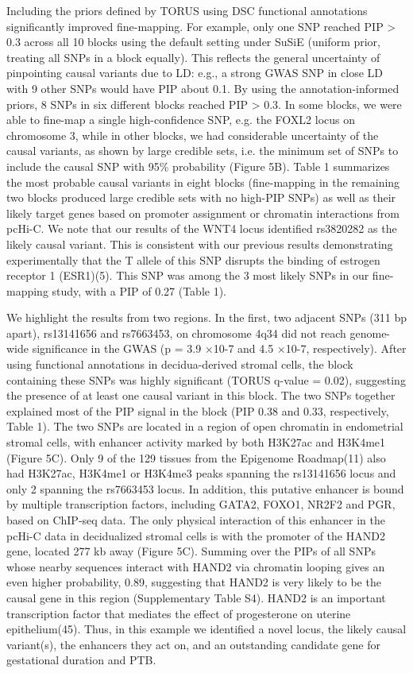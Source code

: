 Including the priors defined by TORUS using DSC  functional annotations significantly improved fine-mapping.  For example, only one SNP reached PIP > 0.3 across all 10 blocks using the
default setting under SuSiE (uniform prior, treating all SNPs in a block equally). This reflects the general uncertainty of pinpointing causal variants due to LD: e.g., a strong GWAS SNP in
close LD with 9 other SNPs would have PIP about 0.1. By using the annotation-informed priors, 8 SNPs in six different blocks reached PIP > 0.3. In some blocks, we were able to fine-map a single
high-confidence SNP, e.g. the FOXL2 locus on chromosome 3, while in other blocks, we had considerable uncertainty of the causal variants, as shown by large credible sets, i.e. the minimum set of
SNPs to include the causal SNP with 95\% probability (Figure 5B). Table 1 summarizes the most probable causal variants in eight blocks (fine-mapping in the remaining two blocks produced large
credible sets with no high-PIP SNPs) as well as their likely target genes based on promoter assignment or chromatin interactions from pcHi-C. We note that our results of the WNT4 locus identified
rs3820282 as the likely causal variant. This is consistent with our previous results demonstrating experimentally that the T allele of this SNP disrupts the binding of estrogen receptor 1 (ESR1)(5).
This SNP was among the 3 most likely SNPs in our fine-mapping study, with a PIP of 0.27 (Table 1). 



We highlight the results from two regions. In the first, two adjacent SNPs (311 bp apart), rs13141656 and rs7663453, on chromosome 4q34 did not reach genome-wide significance in the GWAS (p = 3.9 ×10-7 and 4.5 ×10-7, respectively).
After using functional annotations in decidua-derived stromal cells, the block containing these SNPs was highly significant (TORUS q-value = 0.02), suggesting the presence of at least one causal variant in this block.
The two SNPs together explained most of the PIP signal in the block (PIP 0.38 and 0.33, respectively, Table 1). The two SNPs are located in a region of open chromatin in endometrial stromal cells, with enhancer activity
marked by both H3K27ac and H3K4me1 (Figure 5C). Only 9 of the 129 tissues from the Epigenome Roadmap(11) also had H3K27ac, H3K4me1 or H3K4me3 peaks spanning the rs13141656 locus and only 2 spanning the rs7663453 locus.
In addition, this putative enhancer is bound by multiple transcription factors, including GATA2, FOXO1, NR2F2 and PGR, based on ChIP-seq data. The only physical interaction of this enhancer in the pcHi-C data in decidualized
stromal cells is with the promoter of the HAND2 gene, located 277 kb away (Figure 5C). Summing over the PIPs of all SNPs whose nearby sequences interact with HAND2 via chromatin looping gives an even higher probability, 0.89,
suggesting that HAND2 is very likely to be the causal gene in this region (Supplementary Table S4). HAND2 is an important transcription factor that mediates the effect of progesterone on uterine epithelium(45). Thus, in this
example we identified a novel locus, the likely causal variant(s), the enhancers they act on, and an outstanding candidate gene for gestational duration and PTB.  


